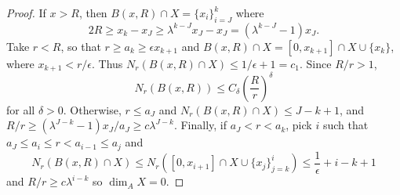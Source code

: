 \documentclass[11pt, a4paper]{memoir}
\theoremstyle{change}
\theoremstyle{plain}
\theoremstyle{nonumberplain}
\newtheorem{proof}{Proof}
\numberwithin{equation}{section}
\begin{document}
\begin{proof}
    If $x>R$, then $B(x,R)\cap X=\{x_i\}_{i=J}^k$ where
    \begin{equation*}
        2R\geq x_k-x_J\geq\lambda^{k-J}x_J-x_J=(\lambda^{k-J}-1)x_J.
    \end{equation*}
    Take $r<R$, so that $r\geq a_k\geq\epsilon x_{k+1}$ and $B(x,R)\cap X=[0,x_{k+1}]\cap X\cup\{x_k\}$, where $x_{k+1}<r/\epsilon$.
    Thus $N_r(B(x,R)\cap X)\leq 1/\epsilon+1=c_1$.
    Since $R/r>1$,
    \begin{equation*}
        N_r(B(x,R))\leq C_\delta\left(\frac{R}{r}\right)^\delta
    \end{equation*}
    for all $\delta>0$.
    Otherwise, $r\leq a_J$ and $N_r(B(x,R)\cap X)\leq J-k+1$, and $R/r\geq(\lambda^{J-k}-1)x_J/a_J\geq c\lambda^{J-k}$.
    Finally, if $a_J<r<a_k$, pick $i$ such that $a_J\leq a_i\leq r<a_{i-1}\leq a_j$ and
    \begin{equation*}
        N_r(B(x,R)\cap X)\leq N_r([0,x_{i+1}]\cap X\cup\{x_j\}_{j=k}^i)\leq\frac{1}{\epsilon}+i-k+1
    \end{equation*}
    and $R/r\geq c\lambda^{i-k}$ so $\dim_A X=0$.
\end{proof}
\end{document}
